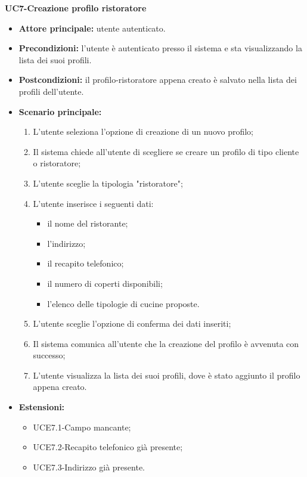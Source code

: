 \textbf{UC7-Creazione profilo ristoratore}
\begin{itemize}
    \item \textbf{Attore principale:} utente autenticato.
    \item \textbf{Precondizioni:} l'utente è autenticato presso il sistema e sta visualizzando la lista dei suoi profili.
    \item \textbf{Postcondizioni:} il profilo-ristoratore appena creato è salvato nella lista dei profili dell'utente.
    \item \textbf{Scenario principale:}
    \begin{enumerate}
        \item L'utente seleziona l'opzione di creazione di un nuovo profilo;
        \item Il sistema chiede all'utente di scegliere se creare un profilo di tipo cliente
        o ristoratore;
        \item L'utente sceglie la tipologia "ristoratore";
        \item L'utente inserisce i seguenti dati:
        \begin{itemize}
            \item il nome del ristorante;
            \item l'indirizzo;
            \item il recapito telefonico;
            \item il numero di coperti disponibili;
            \item l'elenco delle tipologie di cucine proposte.
        \end{itemize}
        \item L'utente sceglie l'opzione di conferma dei dati inseriti;
        \item Il sistema comunica all'utente che la creazione del profilo è avvenuta con successo;
        \item L'utente visualizza la lista dei suoi profili, dove è stato aggiunto il profilo appena creato.
    \end{enumerate}
        \item \textbf{Estensioni:}
        \begin{itemize}
                \item UCE7.1-Campo mancante;
                \item UCE7.2-Recapito telefonico già presente;
                \item UCE7.3-Indirizzo già presente.
        \end{itemize}
\end{itemize}


